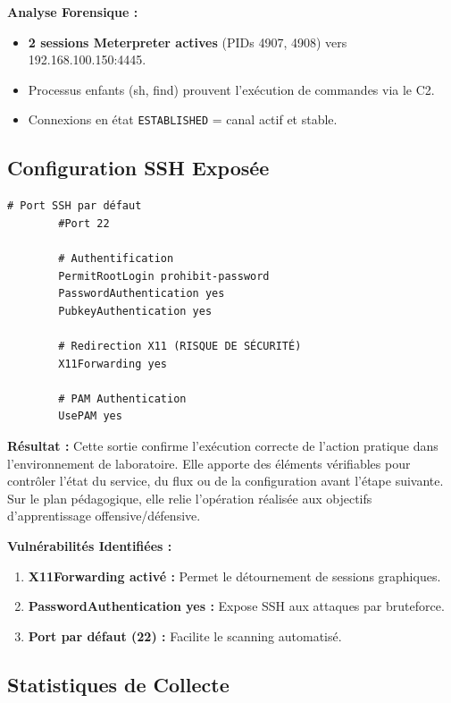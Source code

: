 \documentclass[12pt,a4paper,openany]{report}
\begin{document}
	\textbf{Analyse Forensique :}
	\begin{itemize}
		\item \textbf{2 sessions Meterpreter actives} (PIDs 4907, 4908) vers 192.168.100.150:4445.
		\item Processus enfants (sh, find) prouvent l'exécution de commandes via le C2.
		\item Connexions en état \texttt{ESTABLISHED} = canal actif et stable.
	\end{itemize}
	
	\subsection{Configuration SSH Exposée}
	
	\begin{lstlisting}[caption=Extrait de /etc/ssh/sshd\_config]
		# Port SSH par défaut
		#Port 22
		
		# Authentification
		PermitRootLogin prohibit-password
		PasswordAuthentication yes
		PubkeyAuthentication yes
		
		# Redirection X11 (RISQUE DE SÉCURITÉ)
		X11Forwarding yes
		
		# PAM Authentication
		UsePAM yes
	\end{lstlisting}
	
	\textbf{Résultat :} Cette sortie confirme l'exécution correcte de l'action pratique dans l'environnement de laboratoire. Elle apporte des éléments vérifiables pour contrôler l'état du service, du flux ou de la configuration avant l'étape suivante. Sur le plan pédagogique, elle relie l'opération réalisée aux objectifs d'apprentissage offensive/défensive.
	
	
	\textbf{Vulnérabilités Identifiées :}
	\begin{enumerate}
		\item \textbf{X11Forwarding activé :} Permet le détournement de sessions graphiques.
		\item \textbf{PasswordAuthentication yes :} Expose SSH aux attaques par bruteforce.
		\item \textbf{Port par défaut (22) :} Facilite le scanning automatisé.
	\end{enumerate}
	
	\subsection{Statistiques de Collecte}
	
\end{document}

